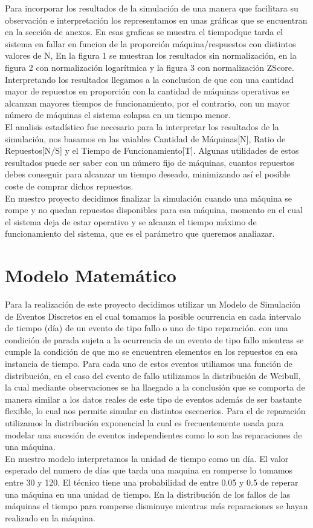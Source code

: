 \documentclass{article}
\begin{document}
 Para incorporar los resultados de la simulación de una manera que facilitara su observación e interpretación los representamos en unas gráficas que se encuentran en la sección de anexos. En esas graficas se muestra el tiempodque tarda el sistema en fallar en funcion de la proporción máquina/respuestos con distintos valores de N, En la figura 1 se muestran los resultados sin normalización, en la figura 2 con normalización logarítmica y la figura 3 con normalización ZScore.
\\
 Interpretando los resultados llegamos a la conclusion de que con una cantidad mayor de repuestos en proporción con la cantidad de máquinas operativas se alcanzan mayores tiempos de funcionamiento, por el contrario, con un mayor número de máquinas el sistema colapsa en un tiempo menor.
\\
 El analisis estadístico fue necesario para la interpretar los resultados de la simulación, nos basamos en las vaiables Cantidad de Máquinas[N], Ratio de Repuestos[N/S] y el Tiempo de Funcionamiento[T]. Algunas utilidades de estos resultados puede ser saber con un número fijo de máquinas, cuantos repuestos debes conseguir para alcanzar un tiempo deseado, minimizando así el posible coste de comprar dichos repuestos.
\\
 En nuestro proyecto decidimos finalizar la simulación  cuando una máquina se rompe y no quedan repuestos disponibles para esa máquina, momento en el cual el sistema deja de estar operativo y se alcanza el tiempo máximo de funcionamiento del sistema, que es el parámetro que queremos analiazar.


\section{Modelo Matemático}
 Para la realización de este proyecto decidimos utilizar un Modelo de Simulación  de Eventos Discretos en el cual tomamos la posible ocurrencia en cada intervalo de tiempo (día) de un evento de tipo fallo o uno de tipo reparación. con una condición de parada sujeta a la ocurrencia de un evento de tipo fallo mientras se cumple la condición de que mo se encuentren elementos en los repuestos en esa instancia de tiempo. Para cada uno de estos eventos utiliamos una función de distribución, en el caso del evento de fallo utilizamos la distribución de Weibull, la cual mediante observaciones se ha llaegado a la conclusión que se comporta de manera similar a los datos reales de este tipo de eventos además de ser bastante flexible, lo cual nos permite simular en distintos escenerios. Para el de reparación utilizamos la distribución exponencial la cual es frecuentemente usada para modelar una sucesión de eventos independientes como lo son las reparaciones de una máquina.
\\
 En nuestro modelo interpretamos la unidad de tiempo como un día. El valor esperado del numero de días que tarda una maquina en romperse lo tomamos entre 30 y 120. El técnico tiene una probabilidad de entre 0.05 y 0.5 de reperar una máquina en una unidad de tiempo. En la distribución de los fallos de las máquinas el tiempo para romperse disminuye mientras más reparaciones se hayan realizado en la máquina.
\end{document}
